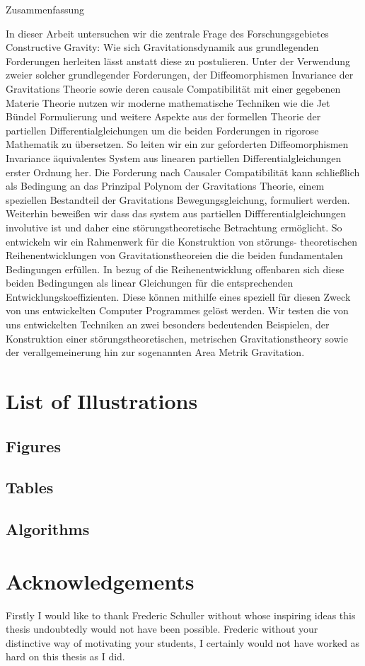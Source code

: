 \documentclass[a4paper,12pt, DIV=14, BCOR=5mm, twoside, headsepline, numbers=noenddot]{scrbook}
\makeatletter
\providecommand\phantomsection{}
\newcommand\listofillustrations{
    \chapter*{List of Illustrations}
    \phantomsection
    \section*{Figures}
    \phantomsection
    \@starttoc{lof}%
    \bigskip
    \section*{Tables}%
    \phantomsection
    \@starttoc{lot}%
    \bigskip
    \section*{Algorithms}%
    \phantomsection
    \@starttoc{loa}
    }
\newenvironment{Zusammenfassung}{%
  \titlepage%
  \null\vfil%
  \begin{center}\normalfont\usekomafont{disposition}Zusammenfassung\end{center}%
}{%
  \par
  \vfil\null%
  \endtitlepage%
}
\makeatother
\begin{document}
\begin{Zusammenfassung}
In dieser Arbeit untersuchen wir die zentrale Frage des Forschungsgebietes Constructive Gravity: Wie sich Gravitationsdynamik aus grundlegenden Forderungen herleiten lässt anstatt diese zu postulieren.
Unter der Verwendung zweier solcher grundlegender Forderungen, der Diffeomorphismen Invariance der Gravitations Theorie sowie deren causale Compatibilität mit einer gegebenen Materie Theorie nutzen wir moderne mathematische Techniken wie die Jet Bündel Formulierung und weitere Aspekte aus der formellen Theorie der partiellen Differentialgleichungen um die beiden Forderungen in rigorose Mathematik zu übersetzen. So leiten wir ein zur geforderten Diffeomorphismen Invariance äquivalentes System aus linearen partiellen Differentialgleichungen erster Ordnung her. Die Forderung nach Causaler Compatibilität kann schließlich als Bedingung an das Prinzipal Polynom der Gravitations Theorie, einem speziellen Bestandteil der Gravitations Bewegungsgleichung, formuliert werden. 
Weiterhin beweißen wir dass das system aus partiellen Diffferentialgleichungen involutive ist und daher eine störungstheoretische Betrachtung ermöglicht. So entwickeln wir ein Rahmenwerk für die Konstruktion von störungs-
theoretischen Reihenentwicklungen von Gravitationstheoreien die die beiden fundamentalen Bedingungen erfüllen. In bezug of die Reihenentwicklung offenbaren sich diese beiden Bedingungen als linear Gleichungen für die entsprechenden Entwicklungskoeffizienten. Diese können mithilfe eines speziell für diesen Zweck von uns entwickelten Computer Programmes gelöst werden.
Wir testen die von uns entwickelten Techniken an zwei besonders bedeutenden Beispielen, der Konstruktion einer störungstheoretischen, metrischen Gravitationstheory sowie der verallgemeinerung hin zur sogenannten Area Metrik Gravitation. 
\end{Zusammenfassung}

\tableofcontents

\listofillustrations

\listoflistings



\chapter*{Acknowledgements}
Firstly I would like to thank Frederic Schuller without whose inspiring ideas this thesis undoubtedly would not have been possible. Frederic without your distinctive way of motivating your students, I certainly would not have worked as hard on this thesis as I did.
\end{document}
